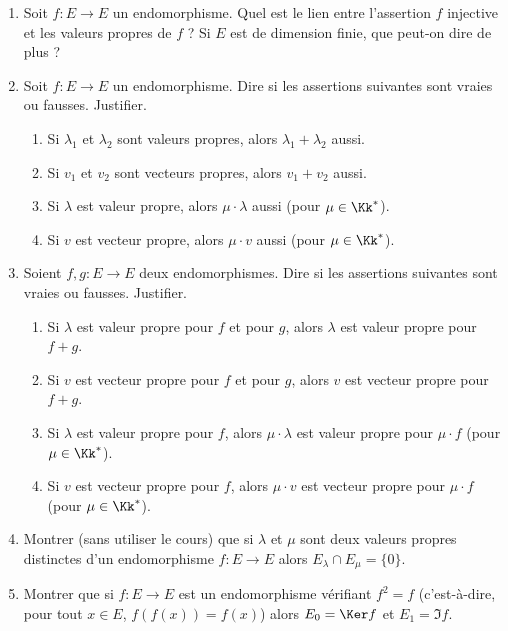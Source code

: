 \documentclass[12pt, class=report,crop=false]{standalone}
\begin{document}
 
\begin{miniexercices}
\sauteligne
\begin{enumerate}
  \item Soit $f : E \to E$ un endomorphisme. Quel est le lien entre l'assertion \og{}$f$ injective\fg{} et les valeurs propres de $f$ ? Si $E$ est de dimension finie, que peut-on dire de plus ?
  
  \item Soit $f : E \to E$ un endomorphisme. Dire si les assertions suivantes sont vraies ou fausses. Justifier.
  \begin{enumerate}
    \item Si $\lambda_1$ et $\lambda_2$ sont valeurs propres, alors $\lambda_1+\lambda_2$ aussi.
    \item Si $v_1$ et $v_2$ sont vecteurs propres, alors $v_1+v_2$ aussi.
    \item Si $\lambda$ est valeur propre, alors $\mu\cdot\lambda$ aussi (pour $\mu\in \Kk^*$).
    \item Si $v$ est vecteur propre, alors $\mu \cdot v$ aussi (pour $\mu\in \Kk^*$).    
  \end{enumerate}

  \item Soient $f,g : E \to E$ deux endomorphismes. Dire si les assertions suivantes sont vraies ou fausses. Justifier.
  \begin{enumerate}
    \item Si $\lambda$ est valeur propre pour $f$ et pour $g$, alors $\lambda$ est valeur propre 
    pour $f+g$.
    \item Si $v$ est vecteur propre pour $f$ et pour $g$, alors $v$ est vecteur propre 
    pour $f+g$.
    \item Si $\lambda$ est valeur propre pour $f$, alors $\mu \cdot\lambda$ est valeur propre 
    pour $\mu \cdot f$ (pour $\mu\in \Kk^*$).
    \item Si $v$ est vecteur propre pour $f$, alors $\mu \cdot v$ est vecteur propre 
    pour $\mu \cdot f$ (pour $\mu\in \Kk^*$).
  \end{enumerate}
  
  \item Montrer (sans utiliser le cours) que si $\lambda$ et $\mu$ sont deux valeurs propres distinctes d'un endomorphisme $f : E \to E$ alors $E_\lambda \cap E_\mu = \{ 0 \}$.
  
  \item Montrer que si $f : E \to E$ est un endomorphisme vérifiant $f^2 = f$ (c'est-à-dire, pour tout $x\in E$, $f(f(x))=f(x)$) alors $E_0 = \Ker f$ et $E_1 = \Im f$.  
  
  
\end{enumerate}
\end{miniexercices}
\end{document}
